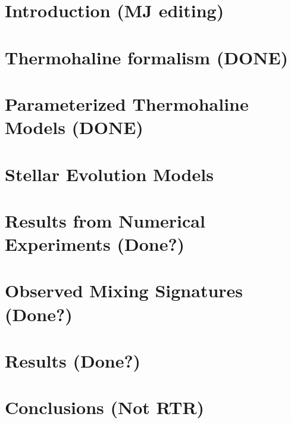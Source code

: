 \documentclass[linenumbers,twocolumn]{aastex62}
\begin{document}

\section{Introduction \textbf{(MJ editing)} }
\label{sec:intro}
\setcounter{footnote}{0}


\section{Thermohaline formalism \textbf{(DONE)}}
\label{sec:formalism}


\section{Parameterized Thermohaline Models \textbf{(DONE)}}
\label{sec:parameterizations}


\section{Stellar Evolution Models} %
\label{sec:mesa_experiment}


\section{Results from Numerical Experiments \textbf{(Done?)}}
\label{sec:mesa_results}


\section{Observed Mixing Signatures \bf({Done?})}
\label{sec:obs}


\section{Results \bf{(Done?)}} 
\label{sec:punchline}


\section{Conclusions \textbf{(Not RTR)}}
\label{sec:conclusions}

\end{document}
